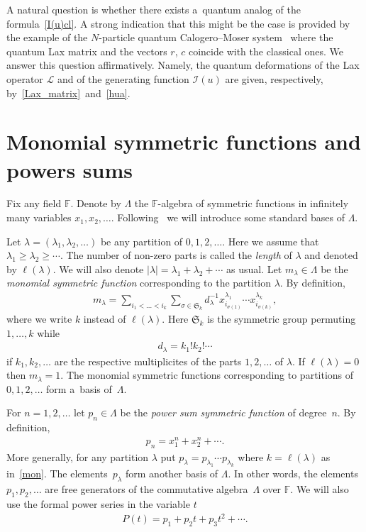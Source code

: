 \documentclass[pdftex]{sigma}
\numberwithin{equation}{section}
\renewcommand\ge{\geqslant}
\begin{document}
A natural question is whether there exists a~quantum analog of the formula~\eqref{I(u)cl}.
A strong indication that this might be the case is provided by the example of the $N$-particle quantum
Calogero--Moser system~\cite{UWH} where the quantum Lax matrix and the vectors $r$, $c$ coincide
with the classical ones.
We answer this question af\/f\/irmatively.
Namely, the quantum deformations of the Lax operator $\mathcal L$ and of the generating function $\mathcal
I(u)$ are given, respectively, by~\eqref{Lax_matrix}~and~\eqref{hua}.

\section{Monomial symmetric functions and powers sums}\label{Section3}

Fix any f\/ield $\mathbb F$.
Denote by $\Lambda$ the $\mathbb F$-algebra of symmetric functions in inf\/initely many variables
$x_1,x_2,\ldots$.
Following~\cite{M} we will introduce some standard bases of $\Lambda$.

Let $\lambda=(\lambda_1,\lambda_2,\ldots)$ be any partition of $0,1,2,\ldots$.
Here we assume that $\lambda_1\ge\lambda_2\ge\cdots$.
The number of non-zero parts is called the {\it length} of $\lambda$ and denoted by $\ell(\lambda)$.
We will also denote $|\lambda|=\lambda_1+\lambda_2+\cdots$ as usual.
Let $m_\lambda\in\Lambda$ be the \textit{monomial symmetric function} corresponding to the partition
$\lambda$.
By def\/inition,
\begin{gather}
\label{mon}
m_\lambda=\sum_{i_1<\dots<i_k}
\sum_{\sigma\in\mathfrak{S}_k}d_\lambda^{-1}x_{i_{\sigma(1)}}^{\lambda_1}\cdots x_{i_{\sigma(k)}}^{\lambda_k},
\end{gather}
where we write $k$ instead of $\ell(\lambda)$.
Here $\mathfrak{S}_k$ is the symmetric group permuting $1,\ldots, k$ while
\begin{gather}
\label{cela}
d_\lambda=k_1!k_2!\cdots
\end{gather}
if $k_1, k_2,\ldots$ are the respective multiplicites of the parts $1,2,\ldots$ of $\lambda$.
If $\ell(\lambda)=0$ then $m_\lambda=1$.
The monomial symmetric functions corresponding to partitions of $0,1,2,\ldots$ form a~basis of~$\Lambda$.

For $n=1,2,\ldots$ let $p_n\in\Lambda$ be the \textit{power sum symmetric function} of degree~$n$.
By def\/inition,
\begin{gather}
\label{pon}
p_n=x_1^n+x_2^n+\cdots.
\end{gather}
More generally, for any partition $\lambda$ put $ p_\lambda=p_{\lambda_1}\cdots p_{\lambda_k} $ where
$k=\ell(\lambda)$ as in~\eqref{mon}.
The ele\-ments~$p_\lambda$ form another basis of $\Lambda$.
In other words, the elements $p_1,p_2,\ldots$ are free generators of the commutative algebra~$\Lambda$ over
$\mathbb F$.
We will also use the formal power series in the variable $t$
\begin{gather*}
P(t)=p_1+p_2t+p_3t^2+\cdots.
\end{gather*}
\end{document}
